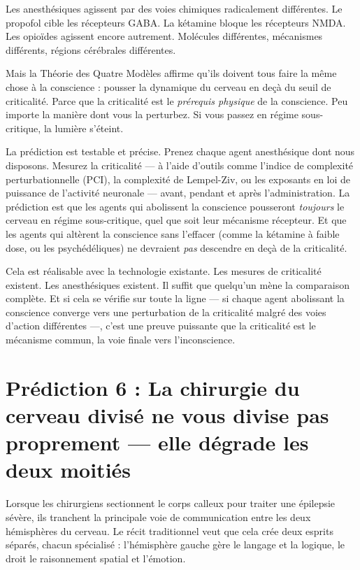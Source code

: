 \documentclass[11pt, twoside, openright]{book}
\begin{document}
Les anesthésiques agissent par des voies chimiques radicalement différentes. Le propofol cible les récepteurs GABA. La kétamine bloque les récepteurs NMDA. Les opioïdes agissent encore autrement. Molécules différentes, mécanismes différents, régions cérébrales différentes.

Mais la Théorie des Quatre Modèles affirme qu'ils doivent tous faire la même chose à la conscience : pousser la dynamique du cerveau en deçà du seuil de criticalité. Parce que la criticalité est le \textit{prérequis physique} de la conscience. Peu importe la manière dont vous la perturbez. Si vous passez en régime sous-critique, la lumière s'éteint.

La prédiction est testable et précise. Prenez chaque agent anesthésique dont nous disposons. Mesurez la criticalité --- à l'aide d'outils comme l'indice de complexité perturbationnelle (PCI), la complexité de Lempel-Ziv, ou les exposants en loi de puissance de l'activité neuronale --- avant, pendant et après l'administration. La prédiction est que les agents qui abolissent la conscience pousseront \textit{toujours} le cerveau en régime sous-critique, quel que soit leur mécanisme récepteur. Et que les agents qui altèrent la conscience sans l'effacer (comme la kétamine à faible dose, ou les psychédéliques) ne devraient \textit{pas} descendre en deçà de la criticalité.

Cela est réalisable avec la technologie existante. Les mesures de criticalité existent. Les anesthésiques existent. Il suffit que quelqu'un mène la comparaison complète. Et si cela se vérifie sur toute la ligne --- si chaque agent abolissant la conscience converge vers une perturbation de la criticalité malgré des voies d'action différentes ---, c'est une preuve puissante que la criticalité est le mécanisme commun, la voie finale vers l'inconscience.

\section*{Prédiction 6 : La chirurgie du cerveau divisé ne vous divise pas proprement --- elle dégrade les deux moitiés}

Lorsque les chirurgiens sectionnent le corps calleux pour traiter une épilepsie sévère, ils tranchent la principale voie de communication entre les deux hémisphères du cerveau. Le récit traditionnel veut que cela crée deux esprits séparés, chacun spécialisé : l'hémisphère gauche gère le langage et la logique, le droit le raisonnement spatial et l'émotion.
\end{document}
